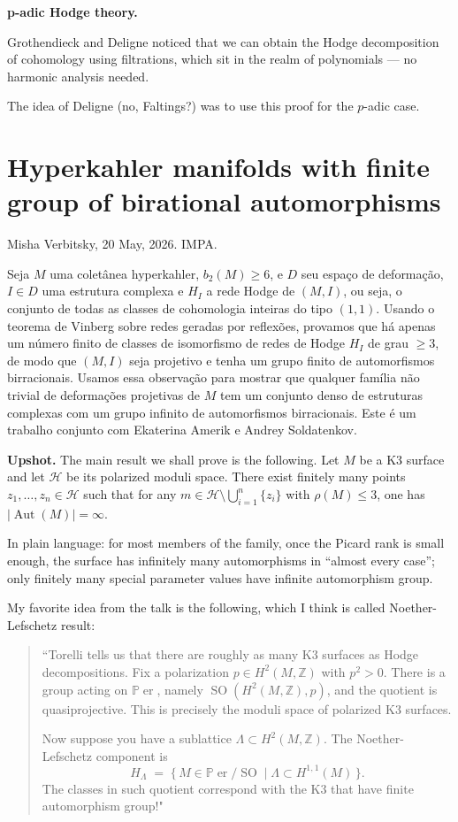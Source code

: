 \medskip\noindent
{\bf p-adic Hodge theory.}

Grothendieck and Deligne
noticed that we can obtain
the Hodge decomposition of cohomology
using filtrations, which sit
in the realm of polynomials ---
no harmonic analysis needed.

The idea of Deligne (no, Faltings?) 
was to use
this proof for the $p$-adic case.

\section{Hyperkahler manifolds with 
finite group of birational automorphisms}
\label{section-hk-misha-26}

\noindent
Misha Verbitsky, 20 May, 2026. IMPA.

\medskip{} Seja $M$ uma
coletânea hyperkahler, $b_2(M)\ge 6$, e $D$ seu
espaço de deformação, $I\in D$ uma estrutura
complexa e $H_I$ a rede Hodge de $(M,I)$, ou seja,
o conjunto de todas as classes de cohomologia
inteiras do tipo $(1,1)$. Usando o teorema de
Vinberg sobre redes geradas por reflexões,
provamos que há apenas um número finito de
classes de isomorfismo de redes de Hodge $H_I$
de grau $\ge 3$, de modo que $(M,I)$ seja projetivo
e tenha um grupo finito de automorfismos
birracionais. Usamos essa observação para
mostrar que qualquer família não trivial de
deformações projetivas de $M$ tem um conjunto
denso de estruturas complexas com um grupo
infinito de automorfismos birracionais. Este
é um trabalho conjunto com Ekaterina Amerik e
Andrey Soldatenkov.  


\medskip\noindent
{\bf Upshot.}
The main result we shall prove is the
following.
Let $M$ be a K3 surface and let $\mathcal{H}$
be its polarized moduli space.
There exist finitely many points
$z_1,\dots,z_n \in \mathcal{H}$
such that for any
$m \in \mathcal{H}\setminus \bigcup_{i=1}^n \{z_i\}$
with $\rho(M)\leq 3$, one has
$\lvert \operatorname{Aut}(M)\rvert=\infty$.

In plain language: for most members of the
family, once the Picard rank is small enough,
the surface has infinitely many
automorphisms in ``almost every case'';
only finitely many special
parameter values have infinite automorphism
group.

My favorite idea from the talk is the
following, which I think is called
Noether-Lefschetz result:

\begin{quotation}
  ``Torelli tells us that there are roughly as many
K3 surfaces as Hodge decompositions. Fix a
polarization $p \in H^2(M,\mathbb{Z})$ with
$p^2>0$. There is a group acting on
$\mathbb{P}\operatorname{er}$, namely
$\operatorname{SO}(H^2(M,\mathbb{Z}),p)$, and the
quotient is quasiprojective. This is precisely the
moduli space of polarized K3 surfaces.

\noindent
Now suppose you have a sublattice
$\Lambda \subset H^2(M,\mathbb{Z})$. The
Noether-Lefschetz component is
\[
H_{\Lambda}
\;=\;
\{\,M \in \mathbb{P}\operatorname{er}/\operatorname{SO}
\mid \Lambda \subset H^{1,1}(M)\,\}.
\]
The classes in such quotient correspond
with the K3 that have finite automorphism
group!"
\end{quotation}


